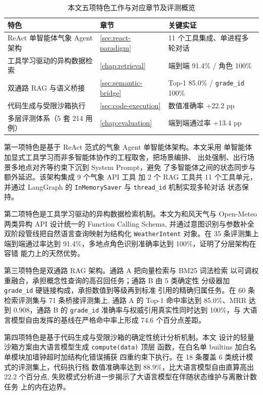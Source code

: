 \documentclass[a4paper]{article}
\newcommand{\song}{\CJKfamily{song}}
\theoremstyle{definition}
\theoremstyle{plain}
\theoremstyle{remark}
\newcommand{\bk}{\discretionary{}{}{}}
\begin{document}
\begin{table}[!ht]
    \centering
    \caption{本文五项特色工作与对应章节及评测概览}
    \label{tab:contributions}
    \song\fontsize{9pt}{12pt}\selectfont
    \renewcommand{\arraystretch}{0.95}
    \begin{tabular}{lll}
        \toprule
        特色 & 章节 & 关键实证 \\
        \midrule
        ReAct 单智能体气象 Agent 架构 & \ref{sec:react-paradigm} & 11 个工具集成、单进程多轮对话 \\
        工具学习驱动的异构数据检索 & \ref{chap:retrieval} & 端到端 91.4\% / 角色 100\% \\
        双通路 RAG 与语义桥接 & \ref{sec:semantic-bridge} & Top-1 85.0\% / \texttt{grade\_\bk{}id} 100\% \\
        代码生成与受限沙箱执行 & \ref{sec:code-execution} & 数值准确率 +22.2 pp \\
        多层评测体系（5 套 214 用例） & \ref{chap:evaluation} & 端到端通过率 +13.4 pp \\
        \bottomrule
    \end{tabular}
\end{table}

第一项特色是基于 ReAct 范式的气象 Agent 单智能体架构。本文采用
单智能体加显式工具学习而非多智能体协作的工程取舍，把场景编排、
出处强制、出行场景多地点对齐等约束下沉到 System Prompt，避免
了多智能体之间的状态同步与额外延迟。该架构集成 9 个气象 API 工具
加 2 个 RAG 工具共 11 个工具单元，并通过 LangGraph 的
\texttt{InMemorySaver} 与 \texttt{thread\_\bk{}id} 机制实现多轮对话
状态保持。

第二项特色是工具学习驱动的异构数据检索机制。本文为和风天气与
Open-Meteo 两类异构 API 设计统一的 Function Calling Schema,
并通过意图识别与参数补全双阶段管线把自然语言查询映射为结构化
\texttt{WeatherIntent} 对象。在 35 条评测集上端到端通过率达到
91.4\%，多地点角色识别准确率达到 100\%，证明了分层架构在容错
能力上的天然优势。

第三项特色是双通路 RAG 架构。通路 A 把向量检索与 BM25 词法检索
以可调权重融合，承担概念性查询的高召回任务；通路 B 由 5 类确定性
分级器加 \texttt{grade\_\bk{}id} 硬链接构成，承担数值到等级再到标准
引用的精确归属任务。在 60 条检索评测集与 71 条桥接评测集上,
通路 A 的 Top-1 命中率达到 85.0\%、MRR 达到 0.908，通路 B 的
\texttt{grade\_\bk{}id} 准确率与权威引用真实性同时达到 100\%，与
大语言模型自由发挥的基线在严格命中率上形成 74.6 个百分点差距。

第四项特色是基于代码生成与受限沙箱的确定性统计分析机制。本文
设计的轻量沙箱方案由大语言模型生成 \texttt{compute(data)} 顶层
函数，在白名单 builtins 加白名单模块加墙钟超时加结构化错误捕获
四重约束下执行。在 18 条覆盖 6 类统计模式的评测集上，代码执行档
数值准确率达到 88.9\%，比大语言模型自由直算高出 22.2 个百分点,
失败模式分析进一步揭示了大语言模型在伴随状态维护与离散计数任务
上的内在边界。
\end{document}
